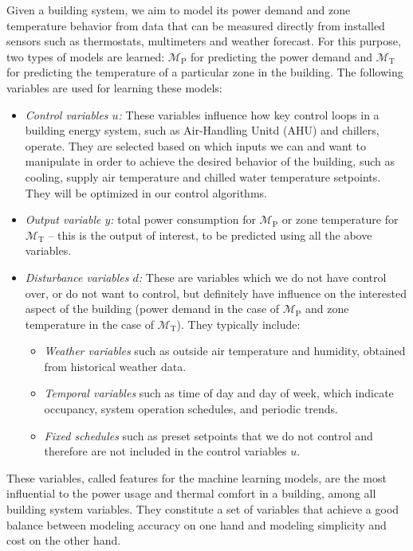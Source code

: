Given a building system, we aim to model its power demand and zone temperature behavior from data that can be measured directly from installed sensors such as thermostats, multimeters and weather forecast.
For this purpose, two types of models are learned: \(\mathcal{M}_{\mathrm{P}}\) for predicting the power demand and \(\mathcal{M}_{\mathrm{T}}\) for predicting the temperature of a particular zone in the building.
The following variables are used for learning these models:
\begin{itemize}
\item \textit{Control variables \(u\):} These variables influence how key control loops in a building energy system, such as Air-Handling Unitd (AHU) and chillers, operate.  They are selected based on which inputs we can and want to manipulate in order to achieve the desired behavior of the building, such as cooling, supply air temperature and chilled water temperature setpoints.  They will be optimized in our control algorithms.
\item \textit{Output variable \(y\):} total power consumption for \(\mathcal{M}_{\mathrm{P}}\) or zone temperature for \(\mathcal{M}_{\mathrm{T}}\) -- this is the output of interest, to be predicted using all the above variables.
\item \textit{Disturbance variables \(d\):} These are variables which we do not have control over, or do not want to control, but definitely have influence on the interested aspect of the building (power demand in the case of $\mathcal{M}_{\mathrm{P}}$ and zone temperature in the case of $\mathcal{M}_{\mathrm{T}}$).  They typically include:
  \begin{itemize}
  \item \emph{Weather variables} such as outside air temperature and humidity, obtained from historical weather data.
  \item \emph{Temporal variables} such as time of day and day of week, which indicate occupancy, system operation schedules, and periodic trends.
  \item \emph{Fixed schedules} such as preset setpoints that we do not control and therefore are not included in the control variables $u$.
  \end{itemize}
\end{itemize}
These variables, called features for the machine learning models, are the most influential to the power usage and thermal comfort in a building, among all building system variables.
They constitute a set of variables that achieve a good balance between modeling accuracy on one hand and modeling simplicity and cost on the other hand.


